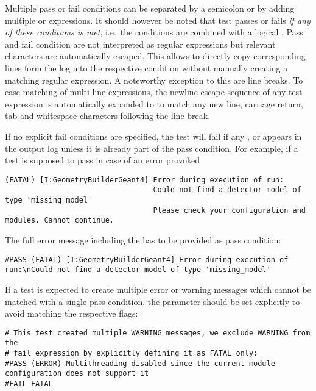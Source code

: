 Multiple pass or fail conditions can be separated by a semicolon or by adding multiple  or  expressions.
It should however be noted that test passes or fails \emph{if any of these conditions is met}, i.e.\ the conditions are combined with a logical .
Pass and fail condition are not interpreted as regular expressions but relevant characters are automatically escaped.
This allows to directly copy corresponding lines form the log into the respective condition without manually creating a matching regular expression.
A noteworthy exception to this are line breaks.
To ease matching of multi-line expressions, the newline escape sequence \parameter{\n} of any test expression is automatically expanded to \parameter{[\r\n\t ]*} to match any new line, carriage return, tab and whitespace characters following the line break.

If no explicit fail conditions are specified, the test will fail if any ,  or  appears in the output log unless it is already part of the pass condition.
For example, if a test is supposed to pass in case of an error provoked

\begin{verbatim}
(FATAL) [I:GeometryBuilderGeant4] Error during execution of run:
                                  Could not find a detector model of type 'missing_model'
                                  Please check your configuration and modules. Cannot continue.
\end{verbatim}

The full error message including the  has to be provided as pass condition:

\begin{verbatim}
#PASS (FATAL) [I:GeometryBuilderGeant4] Error during execution of run:\nCould not find a detector model of type 'missing_model'
\end{verbatim}

If a test is expected to create multiple error or warning messages which cannot be matched with a single pass condition, the  parameter should be set explicitly to avoid matching the respective flags:

\begin{verbatim}
# This test created multiple WARNING messages, we exclude WARNING from the
# fail expression by explicitly defining it as FATAL only:
#PASS (ERROR) Multithreading disabled since the current module configuration does not support it
#FAIL FATAL
\end{verbatim}

